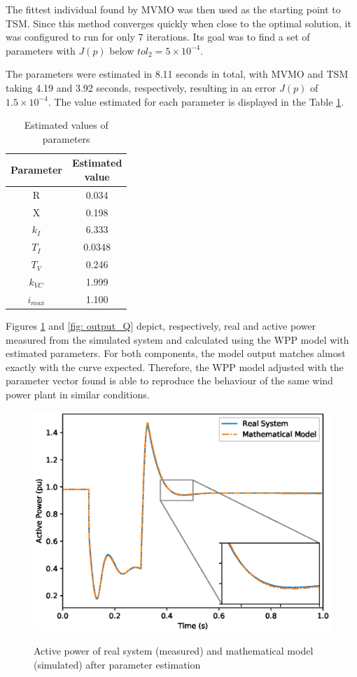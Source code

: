 The fittest individual found by MVMO was then used as the starting point to TSM. Since this method converges quickly when close to the optimal solution, it was configured to run for only 7 iterations. Its goal was to find a set of parameters with $J(p)$ below $tol_{2} = 5\times10^{-4}$.

The parameters were estimated in 8.11 seconds in total, with MVMO and TSM taking 4.19 and 3.92 seconds, respectively, resulting in an error $J(p)$ of $1.5\times 10^{-4}$. The value estimated for each parameter is displayed in the Table \ref{tab: results}.

\begin{table}[h]
	\centering
	\caption{Estimated values of parameters}
	\begin{tabular}{c|c}
		Parameter & \shortstack{Estimated \\ value} \\\hline
		R & 0.034 \\
		X & 0.198 \\
		$k_{I}$ & 6.333 \\
		$T_{I}$ & 0.0348 \\
		$T_{V}$ & 0.246 \\
		$k_{VC}$ & 1.999 \\
		$i_{max}$ & 1.100
	\end{tabular}
	\label{tab: results}
\end{table}

Figures \ref{fig: output_P} and \ref{fig: output_Q} depict, respectively, real and active power measured from the simulated system and calculated using the WPP model with estimated parameters. For both components, the model output matches almost exactly with the curve expected. Therefore, the WPP model adjusted with the parameter vector found is able to reproduce the behaviour of the same wind power plant in similar conditions.

\begin{figure}[h]
	\centering
	\caption{Active power of real system (measured) and mathematical model (simulated) after parameter estimation}
	\includegraphics[scale=0.7]{Images/P_compared.eps}
	\label{fig: output_P}
\end{figure}

